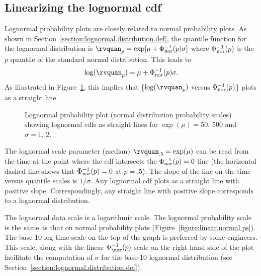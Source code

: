 \subsection{Linearizing the lognormal cdf}
Lognormal probability plots are closely related to
normal probability plots.
As shown in Section~\ref{section:lognormal.distribution.def}, the
quantile function for the lognormal distribution is
$\rvquan_{p}=\exp[\mu + \Phi_{{\rm nor}}^{-1}(p) \sigma ]$ where
$\Phi^{-1}_{{\rm nor}}(p)$ is the $p$ quantile of the standard normal
distribution.  This leads to
\begin{displaymath}
\log(\rvquan_{p})= \mu  + \Phi_{{\rm nor}}^{-1}(p) \sigma.
\end{displaymath}
As illustrated in Figure~\ref{figure:loglinear.lognormal.ps}, this implies
that \{$\log(\rvquan_{p})$ 
versus $\Phi_{{\rm nor}}^{-1}(p)$\} plots as a straight
line. 
\begin{figure}
\caption{Lognormal probability plot (normal distribution probability 
scales) showing lognormal cdfs as straight lines for $\exp(\mu)=50$, 500 and
$\sigma=1$, 2.}
\label{figure:loglinear.lognormal.ps}
\end{figure}
The lognormal scale parameter (median) $\rvquan_{.5}=\exp(\mu)$ can be
read from the time at the point 
where the cdf intersects the $\Phi^{-1}_{{\rm nor}}(p)=0$
line (the
horizontal dashed line shows that $\Phi^{-1}_{{\rm nor}}(p)=0$ at
$p =.5$).  The slope of the line on the time versus
quantile scales is $1/\sigma$.  Any
lognormal cdf plots as a straight line with positive slope.
Correspondingly, any straight line with positive slope corresponds to
a lognormal distribution.

The lognormal data scale is a logarithmic scale.  The lognormal
probability scale is the same as that on normal probability plots
(Figure~\ref{figure:linear.normal.ps}). The base-10 log-time scale
on the top of the graph is preferred by some engineers.  This scale,
along with the linear $\Phi_{\nor}^{-1}(p)$ scale on the right-hand
side of the plot facilitate the computation of $\sigma$ for the
base-10 lognormal distribution (see
Section~\ref{section:lognormal.distribution.def}).

